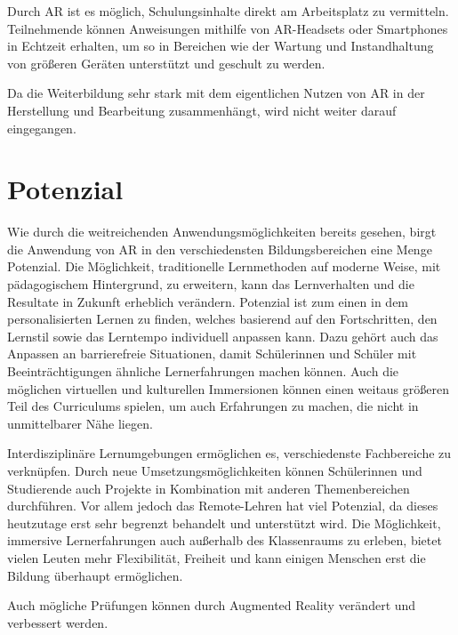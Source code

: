 \documentclass[conference]{IEEEtran}
\begin{document}
Durch AR ist es möglich, Schulungsinhalte direkt am Arbeitsplatz zu vermitteln. Teilnehmende können Anweisungen mithilfe von AR-Headsets oder Smartphones in Echtzeit erhalten,
um so in Bereichen wie der Wartung und Instandhaltung von größeren Geräten unterstützt und geschult zu werden.

Da die Weiterbildung sehr stark mit dem eigentlichen Nutzen von AR in der Herstellung und Bearbeitung zusammenhängt, wird nicht weiter darauf eingegangen.

\section{Potenzial}
Wie durch die weitreichenden Anwendungsmöglichkeiten bereits gesehen, birgt die Anwendung von AR in den verschiedensten Bildungsbereichen eine Menge Potenzial.
Die Möglichkeit, traditionelle Lernmethoden auf moderne Weise, mit pädagogischem Hintergrund, zu erweitern, kann das Lernverhalten und die Resultate in Zukunft erheblich verändern. Potenzial ist zum einen in dem personalisierten Lernen zu finden, welches basierend auf den Fortschritten, den Lernstil sowie das Lerntempo individuell anpassen kann. Dazu gehört auch das Anpassen an barrierefreie Situationen, damit Schülerinnen und Schüler mit Beeinträchtigungen ähnliche Lernerfahrungen machen können.
Auch die möglichen virtuellen und kulturellen Immersionen können einen weitaus größeren Teil des Curriculums spielen, um auch Erfahrungen zu machen, die nicht in unmittelbarer Nähe liegen.

Interdisziplinäre Lernumgebungen ermöglichen es, verschiedenste Fachbereiche zu verknüpfen. Durch neue Umsetzungsmöglichkeiten können Schülerinnen und Studierende auch Projekte in Kombination mit anderen Themenbereichen durchführen. 
Vor allem jedoch das Remote-Lehren hat viel Potenzial, da dieses heutzutage erst sehr begrenzt behandelt und unterstützt wird. Die Möglichkeit, immersive Lernerfahrungen auch außerhalb des Klassenraums zu erleben, bietet vielen Leuten mehr Flexibilität, Freiheit und kann einigen Menschen erst die Bildung überhaupt ermöglichen. 

Auch mögliche Prüfungen können durch Augmented Reality verändert und verbessert werden.
\end{document}

